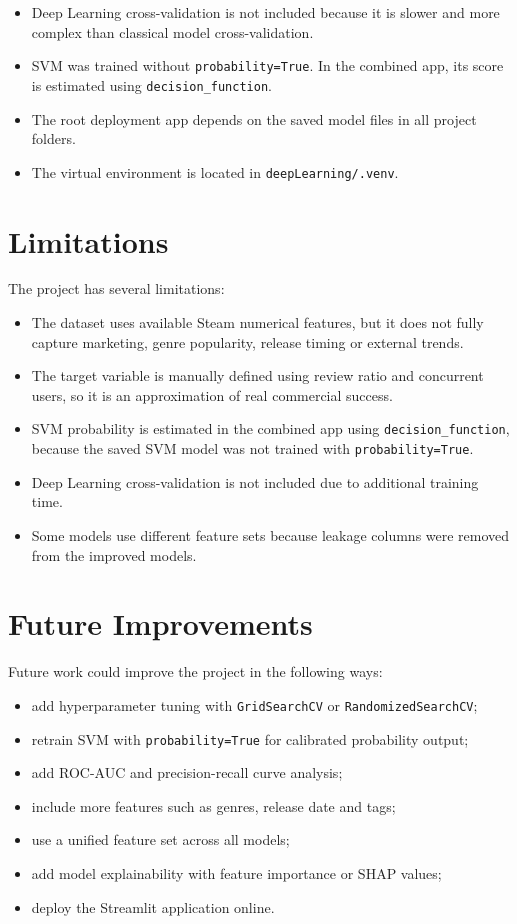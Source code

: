 \documentclass[12pt,a4paper]{article}
\begin{document}
\begin{itemize}[noitemsep]
    \item Deep Learning cross-validation is not included because it is slower and more complex than classical model cross-validation.
    \item SVM was trained without \texttt{probability=True}. In the combined app, its score is estimated using \texttt{decision\_function}.
    \item The root deployment app depends on the saved model files in all project folders.
    \item The virtual environment is located in \texttt{deepLearning/.venv}.
\end{itemize}

\section{Limitations}

The project has several limitations:

\begin{itemize}[noitemsep]
    \item The dataset uses available Steam numerical features, but it does not fully capture marketing, genre popularity, release timing or external trends.
    \item The target variable is manually defined using review ratio and concurrent users, so it is an approximation of real commercial success.
    \item SVM probability is estimated in the combined app using \texttt{decision\_function}, because the saved SVM model was not trained with \texttt{probability=True}.
    \item Deep Learning cross-validation is not included due to additional training time.
    \item Some models use different feature sets because leakage columns were removed from the improved models.
\end{itemize}

\section{Future Improvements}

Future work could improve the project in the following ways:

\begin{itemize}[noitemsep]
    \item add hyperparameter tuning with \texttt{GridSearchCV} or \texttt{RandomizedSearchCV};
    \item retrain SVM with \texttt{probability=True} for calibrated probability output;
    \item add ROC-AUC and precision-recall curve analysis;
    \item include more features such as genres, release date and tags;
    \item use a unified feature set across all models;
    \item add model explainability with feature importance or SHAP values;
    \item deploy the Streamlit application online.
\end{itemize}
\end{document}

